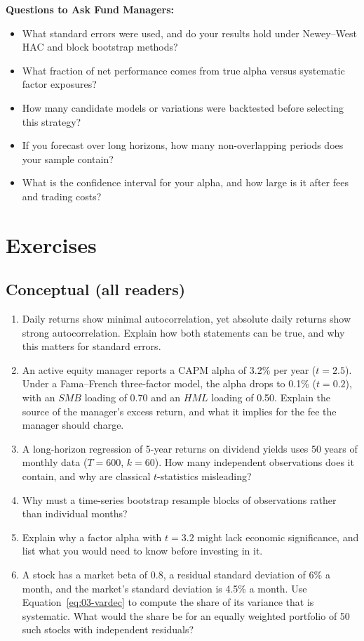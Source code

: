 \textbf{Questions to Ask Fund Managers:}
\begin{itemize}
  \item What standard errors were used, and do your results hold under Newey--West HAC and block bootstrap methods?
  \item What fraction of net performance comes from true alpha versus systematic factor exposures?
  \item How many candidate models or variations were backtested before selecting this strategy?
  \item If you forecast over long horizons, how many non-overlapping periods does your sample contain?
  \item What is the confidence interval for your alpha, and how large is it after fees and trading costs?
\end{itemize}

\section*{Exercises}

\subsection*{Conceptual (all readers)}
\begin{enumerate}
  \item Daily returns show minimal autocorrelation, yet absolute daily returns show strong autocorrelation. Explain how both statements can be true, and why this matters for standard errors.
  \item An active equity manager reports a CAPM alpha of 3.2\% per year ($t = 2.5$). Under a Fama--French three-factor model, the alpha drops to 0.1\% ($t = 0.2$), with an $SMB$ loading of 0.70 and an $HML$ loading of 0.50. Explain the source of the manager's excess return, and what it implies for the fee the manager should charge.
  \item A long-horizon regression of 5-year returns on dividend yields uses 50 years of monthly data ($T=600$, $k=60$). How many independent observations does it contain, and why are classical $t$-statistics misleading?
  \item Why must a time-series bootstrap resample blocks of observations rather than individual months?
  \item Explain why a factor alpha with $t = 3.2$ might lack economic significance, and list what you would need to know before investing in it.
  \item A stock has a market beta of 0.8, a residual standard deviation of 6\% a month, and the market's standard deviation is 4.5\% a month. Use Equation~\eqref{eq:03-vardec} to compute the share of its variance that is systematic. What would the share be for an equally weighted portfolio of 50 such stocks with independent residuals?
\end{enumerate}

